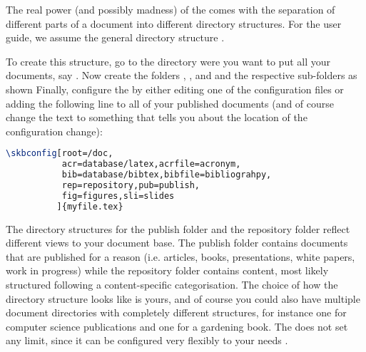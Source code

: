 
The real power (and possibly madness) of the  comes with the separation of
different parts of a document into different directory structures. For the user guide,
we assume the  general directory structure%
%
.


To create this structure, go to the directory were you want to put all your 
documents, say . Now create the folders ,
,  and  and the 
respective sub-folders as shown  Finally, configure the 
 by either editing one of the configuration files or adding the following line
to all of your published documents (and of course change the text 
to something that tells you about the location of the configuration change):

\begin{lstlisting}[style=generic,language=TeX]
\skbconfig[root=/doc,
           acr=database/latex,acrfile=acronym,
           bib=database/bibtex,bibfile=bibliograhpy,
           rep=repository,pub=publish,
           fig=figures,sli=slides
          ]{myfile.tex}
\end{lstlisting}

The directory structures for the publish folder and the repository folder reflect different
views to your document base. The publish folder contains documents that are published for a
reason (i.e. articles, books, presentations, white papers, work in progress) while the 
repository folder contains content, most likely structured following a content-specific 
categorisation. The choice of how the directory structure looks like is yours, and of course 
you could also have multiple document directories with completely different structures, for instance
one for computer science publications and one for a gardening book. The  does not set any 
limit, since it can be configured very flexibly to your needs
%
.
